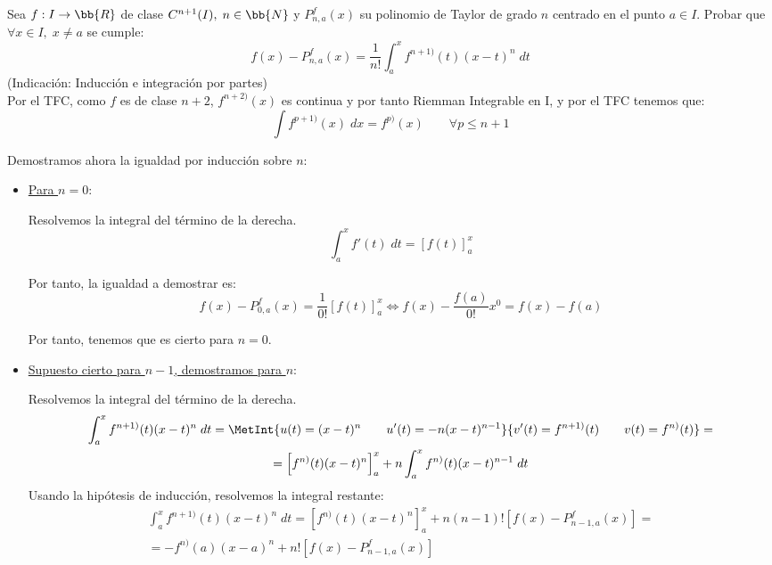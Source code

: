 \documentclass[12pt]{article}
\begin{document}
\begin{ejercicio}
    Sea $f:I\to \bb{R}$ de clase $C^{n+1}(I),\;n\in \bb{N}$ y $P_{n,a}^f(x)$ su polinomio de Taylor de grado $n$ centrado en el punto $a\in I$. Probar que $\forall x\in I,\;x\neq a$ se cumple:
    \begin{equation*}
        f(x) - P_{n,a}^f(x) = \frac{1}{n!}\int_a^x f^{n+1)}(t) (x-t)^n\;dt
    \end{equation*}
    (Indicación: Inducción e integración por partes)\\

    Por el TFC, como $f$ es de clase $n+2$, $f^{n+2)}(x)$ es continua y por tanto Riemman Integrable en I, y por el TFC tenemos que:
        \begin{equation*}
            \int f^{p+1)}(x)\;dx = f^{p)}(x) \qquad \forall p\leq n+1
        \end{equation*}


    Demostramos ahora la igualdad por inducción sobre $n$:
    \begin{itemize}

        \item \underline{Para $n=0$}:
    
            Resolvemos la integral del término de la derecha.
            \begin{equation*}
                \int_a^x f'(t)\;dt = \left[f(t)\right]_a^x
            \end{equation*}
    
    
            Por tanto, la igualdad a demostrar es:
            \begin{equation*}
                f(x) - P_{0,a}^f(x) = \frac{1}{0!}\left[f(t)\right]_a^x
                \Longleftrightarrow 
                f(x)- \frac{f(a)}{0!}x^0 = f(x)-f(a)
            \end{equation*}

            Por tanto, tenemos que es cierto para $n=0$.
            
        \item \underline{Supuesto cierto para $n-1$, demostramos para $n$}:

        Resolvemos la integral del término de la derecha.
        \begin{multline*}
            \int_a^x f^{n+1)}(t) (x-t)^n\;dt = \MetInt{u(t)=(x-t)^n \qquad u'(t)=-n(x-t)^{n-1}}{v'(t)=f^{n+1)}(t) \qquad v(t)=f^{n)}(t)}
            =\\=
            \left[f^{n)}(t) (x-t)^n\right]_a^x +n\int_a^x f^{n)}(t)(x-t)^{n-1}\;dt
        \end{multline*}
        Usando la hipótesis de inducción, resolvemos la integral restante:
        \begin{multline*}
            \int_a^x f^{n+1)}(t) (x-t)^n\;dt =
            \left[f^{n)}(t) (x-t)^n\right]_a^x +n(n-1)!\left[f(x)-P_{n-1, a}^f (x)\right]
            =\\=
            -f^{n)}(a) (x-a)^n +n!\left[f(x)-P_{n-1, a}^f (x)\right]
        \end{multline*}


\end{itemize}
\end{ejercicio}
\end{document}
